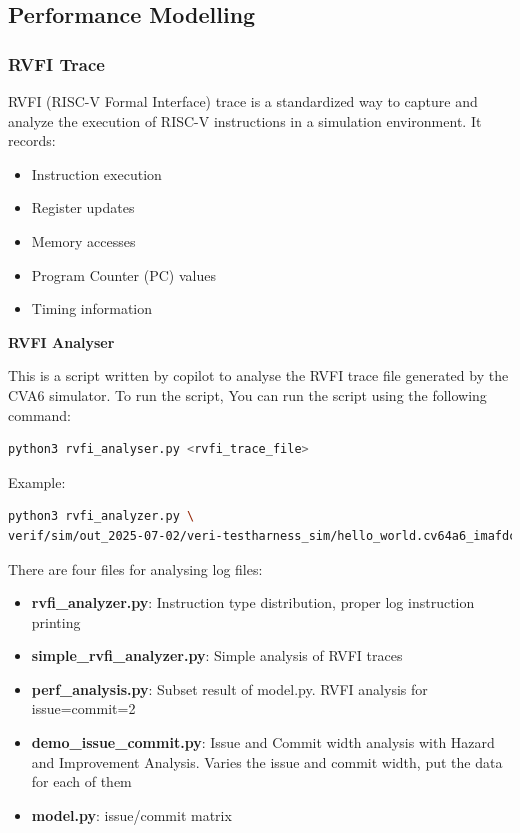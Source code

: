 \documentclass[12pt, a4paper]{article}
\begin{document}
\subsection{Performance Modelling}

\subsubsection{RVFI Trace}

RVFI (RISC-V Formal Interface) trace is a standardized way to capture and analyze the execution of RISC-V instructions in a simulation environment. It records:

\begin{itemize}[nosep]
    \item Instruction execution
    \item Register updates
    \item Memory accesses
    \item Program Counter (PC) values
    \item Timing information
\end{itemize}

\vspace{0.5em}

\textbf{RVFI Analyser}

This is a script written by copilot to analyse the RVFI trace file generated by the CVA6 simulator. To run the script, You can run the script using the following command:

\begin{lstlisting}[language=bash, frame=single, basicstyle=\ttfamily, numbers=none]
   python3 rvfi_analyser.py <rvfi_trace_file>
\end{lstlisting}

Example:
\begin{lstlisting}[language=bash, frame=single, 
    basicstyle=\ttfamily, numbers=none]
python3 rvfi_analyzer.py \
verif/sim/out_2025-07-02/veri-testharness_sim/hello_world.cv64a6_imafdc_sv39.log
\end{lstlisting}      

There are four files for analysing log files:
\begin{itemize}
    \item \textbf{rvfi\_analyzer.py}: Instruction type distribution, proper log instruction printing
    \item \textbf{simple\_rvfi\_analyzer.py}: Simple analysis of RVFI traces
    \item \textbf{perf\_analysis.py}: Subset result of model.py. RVFI analysis for issue=commit=2
    \item \textbf{demo\_issue\_commit.py}: Issue and Commit width analysis with Hazard and Improvement Analysis. Varies the issue and commit width, put the data for each of them
    \item \textbf{model.py}: issue/commit matrix
\end{itemize}
\end{document}
